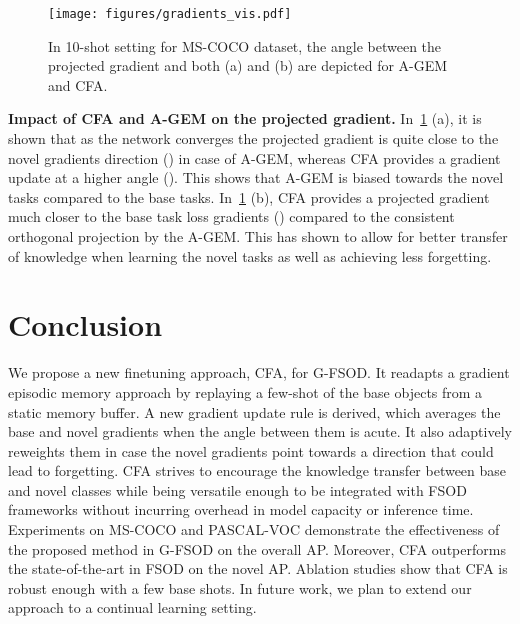 \documentclass[10pt,twocolumn,letterpaper]{article}
\begin{document}
 \begin{figure}[t!]
 \centering
 \texttt{[image: figures/gradients\_vis.pdf]}\vspace{-2mm}
 \caption{In 10-shot setting for MS-COCO dataset, the angle between the projected gradient  and both  (a) and  (b) are depicted for A-GEM~\cite{agem} and CFA.\vspace{-1em}} \label{fig:agem_cfa_comparisons}\vspace{-2mm}
\end{figure}

 \textbf{Impact of CFA and A-GEM on the projected gradient.} In~\cref{fig:agem_cfa_comparisons} (a), it is shown that as the network converges the projected gradient is quite close to the novel gradients direction () in case of A-GEM, whereas CFA provides a gradient update at a higher angle (). This shows that A-GEM is biased towards the novel tasks compared to the base tasks. In~\cref{fig:agem_cfa_comparisons} (b), CFA provides a projected gradient much closer to the base task loss gradients () compared to the consistent orthogonal projection by the A-GEM. This has shown to allow for better transfer of knowledge when learning the novel tasks as well as achieving less forgetting. 


\section{Conclusion}
We propose a new finetuning approach, CFA, for G-FSOD. It readapts a gradient episodic memory approach by replaying a few-shot of the base objects from a static memory buffer. A new gradient update rule is derived, which averages the base and novel gradients when the angle between them is acute. It also adaptively reweights them in case the novel gradients point towards a direction that could lead to forgetting. CFA strives to encourage the knowledge transfer between base and novel classes while being versatile enough to be integrated with FSOD frameworks without incurring overhead in model capacity or inference time. Experiments on MS-COCO and PASCAL-VOC demonstrate the effectiveness of the proposed method in G-FSOD on the overall AP. Moreover, CFA outperforms the state-of-the-art in FSOD on the novel AP. Ablation studies show that CFA is robust enough with a few base shots. In future work, we plan to extend our approach to a continual learning setting.    
\clearpage
{\small


}
\end{document}
